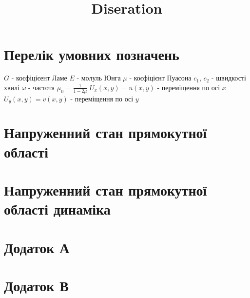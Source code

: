 \documentclass[a4paper,14pt]{extarticle}
\title{Diseration}
\author{}
\date{}
\numberwithin{equation}{section}
\begin{document}
\maketitle

\newpage

\renewcommand{\contentsname}{\centering Зміст}
\tableofcontents

\newpage

\section*{\centering Перелік умовних позначень}
$G$ - коєфіцієент Ламе \newline
$E$ - молуль Юнга \newline
$\mu$ - коєфіцієнт Пуасона \newline
$c_1$, $c_2$ - швидкості хвилі \newline
$\omega$ - частота \newline
$\mu_0 = \frac{1}{1 - 2\mu}$ \newline
$U_x(x,y) = u(x,y)$ - переміщення по осі $x$ \newline
$U_y(x,y) = v(x,y)$ - переміщення по осі $y$

\section{Напруженний стан прямокутної області}


\section{Напруженний стан прямокутної області динаміка}


\section{Додаток А}\label{ap_A_1}


\section{Додаток В}\label{ap_B_1}

\end{document}
